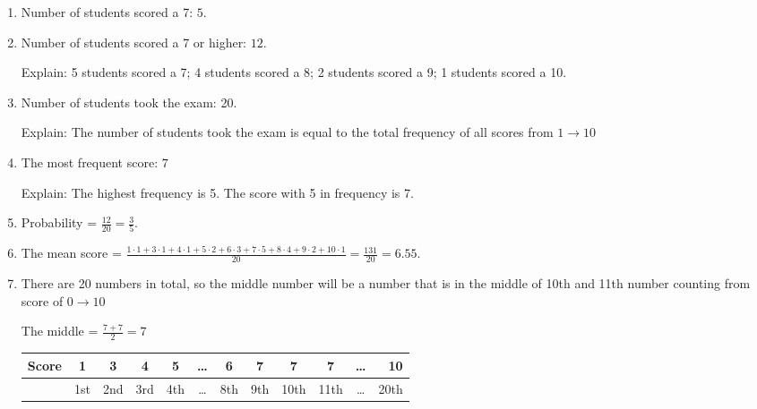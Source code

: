 \documentclass[12pt]{article}
\begin{document}
    \begin{enumerate}
        \item Number of students scored a 7: $5$.
        
        \item Number of students scored a 7 or higher: $12$.\par
        Explain: 5 students scored a 7; 4 students scored a 8; 2 students scored a 9; 1 students scored a 10.
        
        \item Number of students took the exam: 20. \par
        Explain: The number of students took the exam is equal to the total frequency of all scores from $1 \to 10$
        
        \item The most frequent score: $7$ \par
        Explain: The highest frequency is 5. The score with 5 in frequency is 7.
        
        \item Probability = $\frac{12}{20}= \frac{3}{5}$.
        
        \item The mean score = $\frac{1\cdot 1+3\cdot 1+4\cdot 1+5\cdot 2+6\cdot 3+7\cdot 5+8\cdot 4+9\cdot 2+10\cdot 1}{20}=
        \frac{131}{20} = 6.55$.
        
        \item There are 20 numbers in total, so the middle number will be a number that is in the middle of 10th and 11th number counting from score of $0\to 10$ \par
        The middle = $\frac{7+7}{2} = 7$
        
        \begin{center}
            \begin{tabular}{l | c|c|c|c|c|c|c|c|c|c |r}
                Score & 1 & 3 & 4 & 5 & \dots & 6 & 7 & 7 & 7 & \dots & 10 \\
                \hline
                &1st &2nd &3rd &4th &\dots &8th &9th &10th &11th &\dots &20th \\
            \end{tabular}
        \end{center}
        
        \vspace{0.5cm}


    \end{enumerate}
    
\end{document}
